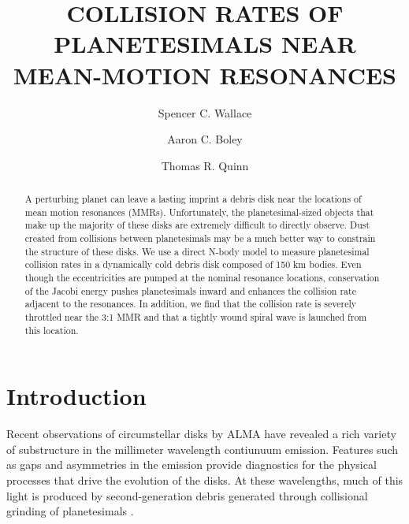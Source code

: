 \documentclass[onecolumn]{aastex63}
\begin{document}
\title{COLLISION RATES OF PLANETESIMALS NEAR MEAN-MOTION RESONANCES}

\author{Spencer C. Wallace}

\author{Aaron C. Boley}

\author{Thomas R. Quinn}

\begin{abstract}
A perturbing planet can leave a lasting imprint a debris disk near the locations of mean motion resonances (MMRs). Unfortunately,
the planetesimal-sized objects that make up the majority of these disks are extremely difficult to directly observe. Dust created from
collisions between planetesimals may be a much better way to constrain the structure of these disks. We use a direct N-body model
to measure planetesimal collision rates in a dynamically cold debris disk composed of 150 km bodies. Even though the eccentricities
are pumped at the nominal resonance locations, conservation of the Jacobi energy pushes planetesimals inward and enhances the
collision rate adjacent to the resonances. In addition, we find that the collision rate is severely throttled near the 3:1 MMR and that a
tightly wound spiral wave is launched from this location.
\end{abstract}

\section{Introduction} \label{sec:intro}


Recent observations of circumstellar disks by ALMA have revealed a rich variety of substructure in the millimeter wavelength
contiunuum emission. Features such as gaps and asymmetries 
\citep{2015ApJ...808L...3A, 2016Sci...353.1519P, PhysRevLett.117.251101, 2016ApJ...820L..40A, 2016Natur.535..258C} in the 
emission provide diagnostics for the physical processes that drive the evolution of the disks. At these wavelengths, much of this light 
is produced by second-generation debris generated through collisional grinding of planetesimals
\citep[see][]{2008ARA&A..46..339W}. 
\end{document}
